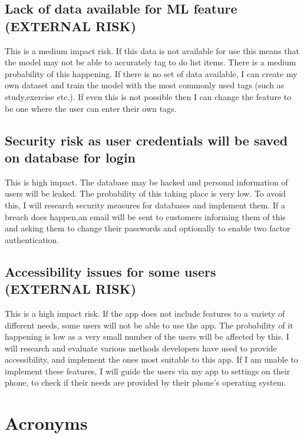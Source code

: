 \documentclass[12pt]{article}
\begin{document}
\subsection{Lack of data available for ML feature (EXTERNAL RISK)}
This is a medium impact risk. If this data is not available for use this means that the model may not be able to accurately tag to do list items. There is a medium probability of this happening. If there is no set of data available, I can create my own dataset and train the model with the most commonly used tags (such as study,exercise etc.).  If even this is not possible then I can change the feature to be one where the user can enter their own tags.


\subsection{Security risk as user credentials will be saved on database for login}
This is high impact. The database may be hacked and personal information of users will be leaked. The probability of this taking place is very low. To avoid this, I will research security measures for databases and implement them. If a breach does happen,an email will be sent to customers informing them of this and asking them to change their passwords and optionally to enable two factor authentication.


\subsection{Accessibility issues for some users (EXTERNAL RISK)}
This is a high impact risk. If the app does not include features to a variety of different needs, some users will not be able to use the app. The probability of it happening is low as a very small number of the users will be affected by this. I will research and evaluate various methods developers have used to provide accessibility, and implement the ones most suitable to this app. If I am unable to implement these features, I will guide the users via my app to settings on their phone, to check if their needs are provided by their phone’s operating system.

\section*{Acronyms}
\begin{acronym}
\end{acronym}
\end{document}
